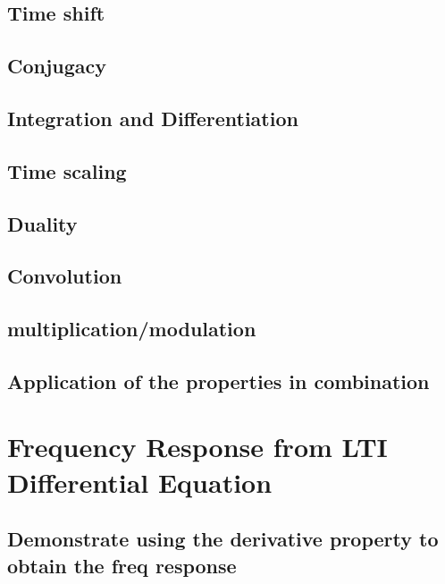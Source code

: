 \documentclass{article}
\begin{document}
\subsection{Time shift}
\label{sec:orgef4cf09}

\subsection{Conjugacy}
\label{sec:org9c26c6c}

\subsection{Integration and Differentiation}
\label{sec:org8e416a7}

\subsection{Time scaling}
\label{sec:org53b0fa4}

\subsection{Duality}
\label{sec:org4485cab}

\subsection{Convolution}
\label{sec:orgf984e94}

\subsection{multiplication/modulation}
\label{sec:org7b3d857}

\subsection{Application of the properties in combination}
\label{sec:orgdb2f8f1}

\newpage
\section{Frequency Response from LTI Differential Equation}
\label{sec:org5067cc8}

\subsection{Demonstrate using the derivative property to obtain the freq response}
\label{sec:org1f03a18}
\end{document}
